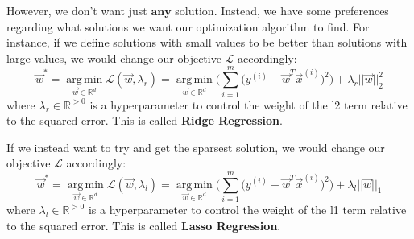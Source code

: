 \documentclass[11pt]{article}
\DeclareMathOperator*{\argmin}{arg\,min}
\begin{document}
\noindent However, we don't want just $\textbf{any}$ solution. Instead, we have some preferences regarding what solutions we want our optimization algorithm to find. For instance, if we define solutions with small values to be better than solutions with large values, we would change our objective $\mathcal{L}$ accordingly:
$$\vec{w}^* = \argmin\limits_{\vec{w}\in \mathbb{R}^d} \mathcal{L}(\vec{w},\lambda_r) = \argmin\limits_{\vec{w}\in \mathbb{R}^d} \Bigg(\sum\limits_{i=1}^m \Big(y^{(i)} - \vec{w}^T\vec{x}^{(i)}\Big)^2\Bigg) + \lambda_r ||\vec{w}||_2^2$$
where $\lambda_r\in \mathbb{R}^{>0}$ is a hyperparameter to control the weight of the l2 term relative to the squared error. This is called \textbf{Ridge Regression}.\newline\newline

\noindent If we instead want to try and get the sparsest solution, we would change our objective $\mathcal{L}$ accordingly:
$$\vec{w}^* = \argmin\limits_{\vec{w}\in \mathbb{R}^d} \mathcal{L}(\vec{w},\lambda_l) = \argmin\limits_{\vec{w}\in \mathbb{R}^d} \Bigg(\sum\limits_{i=1}^m \Big(y^{(i)} - \vec{w}^T\vec{x}^{(i)}\Big)^2\Bigg) + \lambda_l ||\vec{w}||_1$$
where $\lambda_l\in \mathbb{R}^{>0}$ is a hyperparameter to control the weight of the l1 term relative to the squared error. This is called \textbf{Lasso Regression}.\newline\newline
\end{document}
